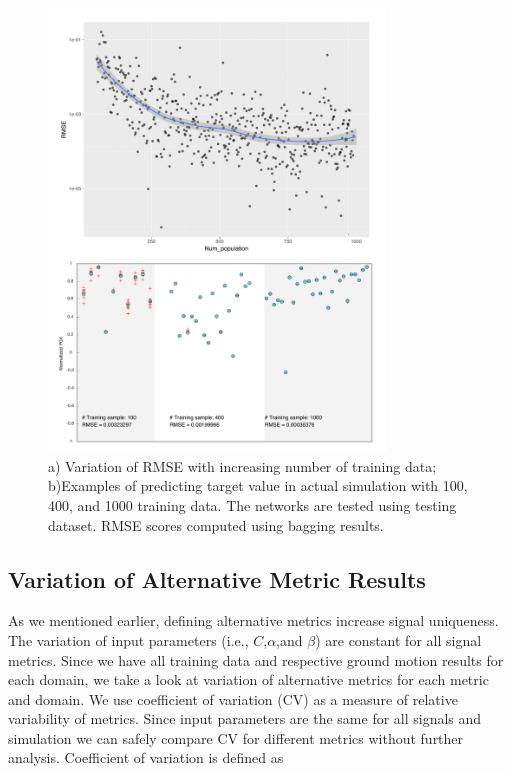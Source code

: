   \begin{figure}[ht]
    \centering
    \includegraphics[width=0.8\textwidth]{figures/pdf/Figure_12.pdf}
    \caption{a) Variation of RMSE with increasing number of training data; b)Examples of predicting target value in actual simulation with 100, 400, and 1000 training data. The networks are tested using testing dataset. RMSE scores computed using bagging results.}
    \label{fig:Figure_ANN_num_training_data_sens}
\end{figure}

\subsection{Variation of Alternative Metric Results}
As we mentioned earlier, defining alternative metrics increase signal uniqueness. The variation of input parameters (i.e., $C$,$\alpha$,and $\beta$) are constant for all signal metrics. Since we have all training data and respective ground motion results for each domain, we take a look at variation of alternative metrics for each metric and domain. We use coefficient of variation (CV) as a measure of relative variability of metrics. Since input parameters are the same for all signals and simulation we can safely compare CV for different metrics without further analysis. Coefficient of variation is defined as 


